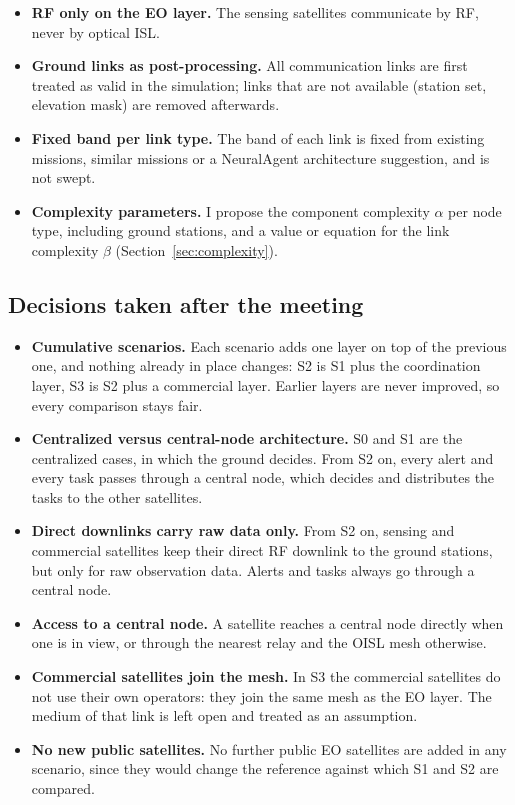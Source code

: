 \documentclass[11pt]{article}
\begin{document}
\begin{itemize}[leftmargin=1.2cm]
    \item \textbf{RF only on the EO layer.} The sensing satellites communicate by RF, never by optical ISL.
    \item \textbf{Ground links as post-processing.} All communication links are first treated as valid in the simulation; links that are not available (station set, elevation mask) are removed afterwards.
    \item \textbf{Fixed band per link type.} The band of each link is fixed from existing missions, similar missions or a NeuralAgent architecture suggestion, and is not swept.
    \item \textbf{Complexity parameters.} I propose the component complexity $\alpha$ per node type, including ground stations, and a value or equation for the link complexity $\beta$ (Section~\ref{sec:complexity}).
\end{itemize}

\subsection{Decisions taken after the meeting}\label{subsec:decisions_after}

\begin{itemize}[leftmargin=1.2cm]
    \item \textbf{Cumulative scenarios.} Each scenario adds one layer on top of the previous one, and nothing already in place changes: S2 is S1 plus the coordination layer, S3 is S2 plus a commercial layer. Earlier layers are never improved, so every comparison stays fair.
    \item \textbf{Centralized versus central-node architecture.} S0 and S1 are the centralized cases, in which the ground decides. From S2 on, every alert and every task passes through a central node, which decides and distributes the tasks to the other satellites.
    \item \textbf{Direct downlinks carry raw data only.} From S2 on, sensing and commercial satellites keep their direct RF downlink to the ground stations, but only for raw observation data. Alerts and tasks always go through a central node.
    \item \textbf{Access to a central node.} A satellite reaches a central node directly when one is in view, or through the nearest relay and the OISL mesh otherwise.
    \item \textbf{Commercial satellites join the mesh.} In S3 the commercial satellites do not use their own operators: they join the same mesh as the EO layer. The medium of that link is left open and treated as an assumption.
    \item \textbf{No new public satellites.} No further public EO satellites are added in any scenario, since they would change the reference against which S1 and S2 are compared.
\end{itemize}
\end{document}
